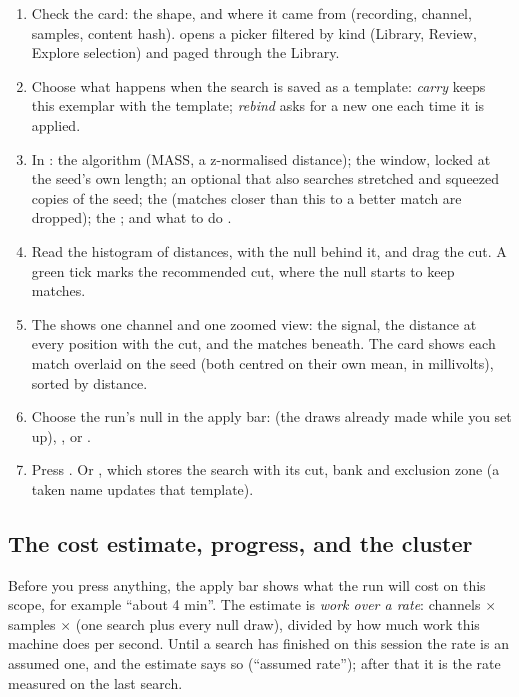 \begin{enumerate}
  \item Check the  card: the shape, and where it came from (recording, channel, samples,
        content hash).  opens a picker filtered by kind (Library, Review, Explore
        selection) and paged through the Library.
  \item Choose what happens when the search is saved as a template: \emph{carry} keeps this exemplar
        with the template; \emph{rebind} asks for a new one each time it is applied.
  \item In : the algorithm (MASS, a z-normalised distance); the window, locked at the
        seed's own length; an optional  that also searches stretched and squeezed
        copies of the seed; the  (matches closer than this to a better match are
        dropped); the ; and what to do .
  \item Read the histogram of distances, with the null behind it, and drag the cut. A green tick
        marks the recommended cut, where the null starts to keep matches.
  \item The  shows one channel and one zoomed view: the signal, the distance at
        every position with the cut, and the matches beneath. The  card shows each match
        overlaid on the seed (both centred on their own mean, in millivolts), sorted by distance.
  \item Choose the run's null in the apply bar:  (the draws already made while
        you set up), , or .
  \item Press . Or , which stores the search with its cut,
        bank and exclusion zone (a taken name updates that template).
\end{enumerate}

\subsection*{The cost estimate, progress, and the cluster}
Before you press anything, the apply bar shows what the run will cost on this scope, for example
``about 4 min''. The estimate is \emph{work over a rate}: channels \(\times\) samples \(\times\) (one
search plus every null draw), divided by how much work this machine does per second. Until a search
has finished on this session the rate is an assumed one, and the estimate says so (``assumed
rate''); after that it is the rate measured on the last search.

